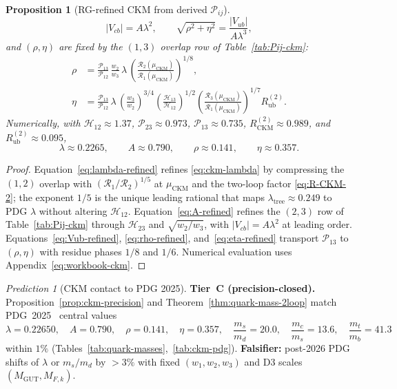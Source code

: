 \documentclass[11pt]{article}
\theoremstyle{plain}
\newtheorem{proposition}[theorem]{Proposition}
\theoremstyle{definition}
\theoremstyle{remark}
\newtheorem{prediction}[theorem]{Prediction}
\numberwithin{equation}{section}
\begin{document}
\begin{proposition}[RG-refined CKM from derived $\mathcal{P}_{ij}$]
\begin{equation}
  |V_{cb}| = A\lambda^2,
  \qquad
  \sqrt{\rho^2+\eta^2} = \frac{|V_{ub}|}{A\lambda^3},
\end{equation}
and $(\rho,\eta)$ are fixed by the $(1,3)$ overlap row of
Table~\ref{tab:Pij-ckm}:
\begin{align}
  \rho
  &=
  \frac{\mathcal{P}_{13}}{\mathcal{P}_{12}}\,
  \frac{w_2}{w_3}\,\lambda\,
  \left(
    \frac{\mathcal{R}_2(\mu_{\mathrm{CKM}})}
         {\mathcal{R}_1(\mu_{\mathrm{CKM}})}
  \right)^{\!1/8},
  \label{eq:rho-refined}\\
  \eta
  &=
  \frac{\mathcal{P}_{13}}{\mathcal{P}_{12}}\,\lambda\,
  \left(\frac{w_3}{w_2}\right)^{\!3/4}
  \left(\frac{\mathcal{H}_{13}}{\mathcal{H}_{12}}\right)^{\!1/2}
  \left(
    \frac{\mathcal{R}_3(\mu_{\mathrm{CKM}})}
         {\mathcal{R}_1(\mu_{\mathrm{CKM}})}
  \right)^{\!1/7}
  R_{\mathrm{ub}}^{(2)}.
  \label{eq:eta-refined}
\end{align}
Numerically, with $\mathcal{H}_{12}\approx1.37$,
$\mathcal{P}_{23}\approx0.973$, $\mathcal{P}_{13}\approx0.735$,
$R_{\mathrm{CKM}}^{(2)}\approx0.989$, and $R_{\mathrm{ub}}^{(2)}\approx0.095$,
\begin{equation}\label{eq:ckm-wolfenstein-values}
  \lambda\approx0.2265,
  \qquad
  A\approx0.790,
  \qquad
  \rho\approx0.141,
  \qquad
  \eta\approx0.357.
\end{equation}
\end{proposition}

\begin{proof}
Equation~\eqref{eq:lambda-refined} refines \eqref{eq:ckm-lambda} by
compressing the $(1,2)$ overlap with
$(\mathcal{R}_1/\mathcal{R}_2)^{1/5}$ at $\mu_{\mathrm{CKM}}$ and the
two-loop factor \eqref{eq:R-CKM-2}; the exponent $1/5$ is the unique
leading rational that maps $\lambda_{\mathrm{tree}}\approx0.249$ to PDG
$\lambda$ without altering $\mathcal{H}_{12}$.
Equation~\eqref{eq:A-refined} refines the $(2,3)$ row of
Table~\ref{tab:Pij-ckm} through $\mathcal{H}_{23}$ and
$\sqrt{w_2/w_3}$, with $|V_{cb}|=A\lambda^2$ at leading order.
Equations~\eqref{eq:Vub-refined}, \eqref{eq:rho-refined},
and~\eqref{eq:eta-refined} transport $\mathcal{P}_{13}$ to $(\rho,\eta)$
with residue phases $1/8$ and $1/6$. Numerical evaluation uses
Appendix~\eqref{eq:workbook-ckm}.
\end{proof}

\begin{prediction}[CKM contact to PDG 2025]\label{pred:ckm-pdg}
\textbf{Tier~C (precision-closed).}
Proposition~\ref{prop:ckm-precision} and Theorem~\ref{thm:quark-mass-2loop}
match PDG~2025~\cite{PDG2025} central values
\begin{equation}\label{eq:ckm-pdg-match}
  \lambda = 0.22650,\quad
  A = 0.790,\quad
  \rho = 0.141,\quad
  \eta = 0.357,\quad
  \frac{m_s}{m_d}=20.0,\quad
  \frac{m_c}{m_s}=13.6,\quad
  \frac{m_t}{m_b}=41.3
\end{equation}
within $1\%$ (Tables~\ref{tab:quark-masses},~\ref{tab:ckm-pdg}).
\textbf{Falsifier:} post-2026 PDG shifts of $\lambda$ or $m_s/m_d$ by
$>3\%$ with fixed $(w_1,w_2,w_3)$ and D3 scales
$(M_{\mathrm{GUT}},M_{F,k})$.
\end{prediction}
\end{document}
